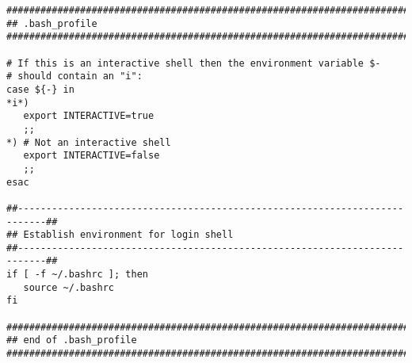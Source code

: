 \begin{verbatim}
###############################################################################
## .bash_profile
###############################################################################

# If this is an interactive shell then the environment variable $-
# should contain an "i":
case ${-} in 
*i*)
   export INTERACTIVE=true
   ;;
*) # Not an interactive shell
   export INTERACTIVE=false
   ;;
esac

##---------------------------------------------------------------------------##
## Establish environment for login shell
##---------------------------------------------------------------------------##
if [ -f ~/.bashrc ]; then
   source ~/.bashrc
fi

###############################################################################
## end of .bash_profile
###############################################################################
\end{verbatim}